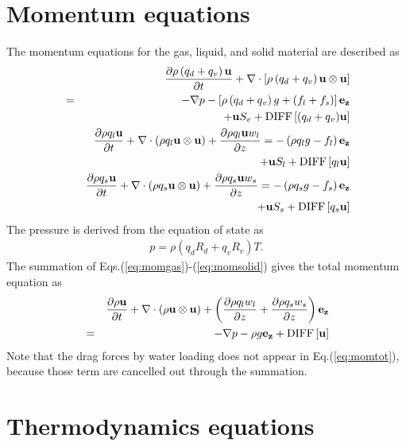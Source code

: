 \section{Momentum equations}

The momentum equations for the gas, liquid, and solid material
are described as
\begin{eqnarray}
&&  \frac{\partial \rho \left(q_d+q_v\right) {\bf u}}{\partial t}
+ \nabla \cdot \left[\rho \left(q_d+q_v\right){\bf u} \otimes {\bf u}\right]\\
&=&
-\nabla p - \left[\rho \left(q_d+q_v\right)g + (f_l+f_s)\right] {\bf e_z}\nonumber\\
&&+{\bf u} S_v +{\rm DIFF}\left[(q_d+q_v){\bf u}\right]
\label{eq:momgas}\\
&&  \frac{\partial \rho q_l {\bf u}}{\partial t}
+ \nabla \cdot \left(\rho q_l{\bf u} \otimes {\bf u}\right)
+ \frac{\partial \rho q_l {\bf u} w_l}{\partial z}
=
 - \left(\rho q_l g - f_l\right) {\bf e_z}\nonumber\\
&&+{\bf u} S_l+{\rm DIFF}\left[q_l{\bf u}\right]
\label{eq:momliquid}\\
&&  \frac{\partial \rho q_s {\bf u}}{\partial t}
+ \nabla \cdot \left(\rho q_s{\bf u} \otimes {\bf u}\right)
+ \frac{\partial \rho q_s {\bf u }w_s}{\partial z}
=
 - \left(\rho q_s g - f_s\right) {\bf e_z}\nonumber\\
&&+{\bf u} S_s+{\rm DIFF}\left[q_s{\bf u}\right]
\label{eq:momsolid}
\end{eqnarray}
The pressure is derived from the equation of state as
\begin{eqnarray}
p=\rho \left(q_d R_d + q_v R_v\right) T.\label{eq:state}
\end{eqnarray}
The summation of Eqs.(\ref{eq:momgas})-(\ref{eq:momsolid})
gives the total momentum equation as
\begin{eqnarray}
&&  \frac{\partial \rho {\bf u}}{\partial t}
+ \nabla \cdot \left(\rho{\bf u} \otimes {\bf u}\right)
+ \left(\frac{\partial \rho q_l w_l}{\partial z}
+ \frac{\partial \rho q_s w_s}{\partial z}\right) {\bf e_z}\nonumber\\
&=&
-\nabla p - \rho g {\bf e_z}
+{\rm DIFF}\left[{\bf u}\right]
\label{eq:momtot}
\end{eqnarray}
Note that the drag forces by water loading does not appear
in Eq.(\ref{eq:momtot}),
because those term are cancelled out through the summation.

\section{Thermodynamics equations}

